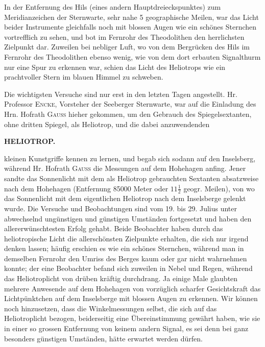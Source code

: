 \par\noindent\hspace*{\parindent}In der Entfernung des Hils (eines andern Hauptdreieckspunktes) zum Meridianzeichen der Sternwarte, sehr nahe 5 geographische Meilen, war das Licht beider Instrumente gleichfalls noch mit blossen Augen wie ein schönes Sternchen vortrefflich zu sehen, und bot im Fernrohr des Theodolithen den herrlichsten Zielpunkt dar. Zuweilen bei nebliger Luft, wo von dem Bergrücken des Hils im Fernrohr des Theodolithen ebenso wenig, wie von dem dort erbauten Signalthurm nur eine Spur zu erkennen war, schien das Licht des Heliotrops wie ein prachtvoller Stern im blauen Himmel zu schweben.

\par\noindent\hspace*{\parindent}Die wichtigsten Versuche sind nur erst in den letzten Tagen angestellt. Hr. Professor \textsc{Encke}, Vorsteher der Seeberger Sternwarte, war auf die Einladung des Hrn. Hofrath \textsc{Gauss} hieher gekommen, um den Gebrauch des Spiegelsextanten, ohne dritten Spiegel, als Heliotrop, und die dabei anzuwendenden

\par\clearpage
\noindent\null\hfill{\small\textbf{HELIOTROP.}}\hfill{}\par\medskip
\noindent kleinen Kunstgriffe kennen zu lernen, und begab sich sodann auf den Inselsberg, während Hr. Hofrath \textsc{Gauss} die Messungen auf dem Hohehagen anfing. Jener sandte das Sonnenlicht mit dem als Heliotrop gebrauchten Sextanten absatzweise nach dem Hohehagen (Entfernung 85000 Meter oder $11\frac12$ geogr. Meilen), von wo das Sonnenlicht mit dem eigentlichen Heliotrop nach dem Inselsberge gelenkt wurde. Die Versuche und Beobachtungen sind vom 19. bis 29. Julius unter abwechselnd ungünstigen und günstigen Umständen fortgesetzt und haben den allererwünschtesten Erfolg gehabt. Beide Beobachter haben durch das heliotropische Licht die allerschönsten Zielpunkte erhalten, die sich nur irgend denken lassen; häufig erschien es wie ein schönes Sternchen, während man in demselben Fernrohr den Umriss des Berges kaum oder gar nicht wahrnehmen konnte; der eine Beobachter befand sich zuweilen in Nebel und Regen, während das Heliotroplicht von drüben kräftig durchdrang. Ja einige Male glaubten mehrere Anwesende auf dem Hohehagen von vorzüglich scharfer Gesichtskraft das Lichtpünktchen auf dem Inselsberge mit blossen Augen zu erkennen. Wir können noch hinzusetzen, dass die Winkelmessungen selbst, die sich auf das Heliotroplicht bezogen, beiderseitig eine Übereinstimmung gewährt haben, wie sie in einer so grossen Entfernung von keinem andern Signal, es sei denn bei ganz besonders günstigen Umständen, hätte erwartet werden dürfen.

